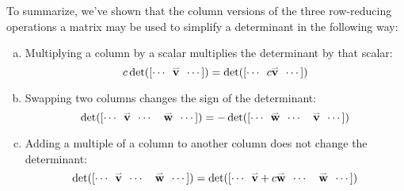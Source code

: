 \begin{fact}
  To summarize, we've shown that the column versions of the three row-reducing operations
  a matrix may be used to simplify a determinant in the following way:
  \begin{enumerate}[(a)]
  \item Multiplying a column by a scalar multiplies the
        determinant by that scalar:
        \[c\det([\cdots\hspace{0.5em}\vec{v}\hspace{0.5em} \cdots])=
        \det([\cdots\hspace{0.5em}c\vec{v}\hspace{0.5em} \cdots])\]
  \item Swapping two columns changes the sign of the determinant:
        \[\det([\cdots\hspace{0.5em}\vec{v}\hspace{0.5em}
        \cdots\hspace{1em}\vec{w}\hspace{0.5em} \cdots])=
        -\det([\cdots\hspace{0.5em}\vec{w}\hspace{0.5em}
        \cdots\hspace{1em}\vec{v}\hspace{0.5em} \cdots])\]
  \item Adding a multiple of a column to another column does not
        change the determinant:
        \[\det([\cdots\hspace{0.5em}\vec{v}\hspace{0.5em}
        \cdots\hspace{1em}\vec{w}\hspace{0.5em} \cdots])=
        \det([\cdots\hspace{0.5em}\vec{v}+c\vec{w}\hspace{0.5em}
        \cdots\hspace{1em}\vec{w}\hspace{0.5em} \cdots])\]
  \end{enumerate}
\end{fact}

